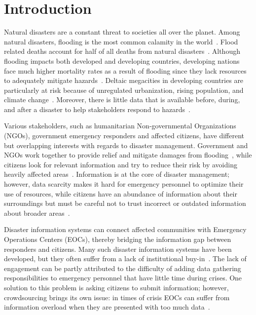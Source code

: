 \chapter{Introduction} Natural disasters are a constant threat to societies all
over the planet. Among natural disasters, flooding is the most common calamity
in the world~\cite{chanFloodRiskAsia2012}.  Flood related deaths account for
half of all deaths from natural disasters~\cite{ohlFloodingHumanHealth2000}.
Although flooding impacts both developed and developing countries, developing
nations face much higher mortality rates as a result of flooding since they lack
resources to adequately mitigate
hazards~\cite{quarantelliUrbanVulnerabilityDisasters2003,
ahernGlobalHealthImpacts2005}. Deltaic megacities in developing countries are
particularly at risk because of unregulated urbanization, rising population, and
climate change~\cite{chanFloodRiskAsia2012}.  Moreover, there is little data
that is available before, during, and after a disaster to help stakeholders
respond to hazards~\cite{meierDigitalHumanitariansHow2015}.

Various stakeholders, such as humanitarian Non-governmental Organizations (NGOs),
government emergency responders and affected citizens, have different but
overlapping interests with regards to disaster management.  Government and NGOs
work together to provide relief and mitigate damages from
flooding~\cite{chanResilientFloodRisk2018}, while citizens
look for relevant information and try to reduce their
risk by avoiding heavily affected
areas~\cite{viewegMicrobloggingTwoNatural2010}. Information is at the core of
disaster management; however, data scarcity makes it hard for emergency
personnel to optimize their use of resources, while citizens have an abundance
of information about their surroundings but must be careful not to trust
incorrect or outdated information about broader
areas~\cite{quarantelliProblematicalAspectsInformation1997}.

Disaster information systems can connect affected communities with
Emergency Operations Centers (EOCs), thereby bridging the information gap
between responders and citizens. Many such disaster information systems have
been developed, but they often suffer from a lack of institutional
buy-in~\cite{aminDataNaturalDisasters2008}. The lack of engagement can be partly
attributed to the difficulty of adding data gathering responsibilities to
emergency personnel that have little time during crises. One solution to this
problem is asking citizens to submit information; however, crowdsourcing brings
its own issue: in times of crisis EOCs can suffer from information overload when
they are presented with too much
data~\cite{tierneyFacingUnexpectedDisaster2001}.

